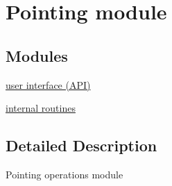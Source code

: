 \hypertarget{group__matmap}{\section{Pointing module}
\label{group__matmap}
}
\subsection*{Modules}
\begin{DoxyCompactItemize}
\item 
\hyperlink{group__matmap__group1}{user interface (\-A\-P\-I)}
\item 
\hyperlink{group__matmap__group2}{internal routines}
\end{DoxyCompactItemize}


\subsection{Detailed Description}
Pointing operations module 